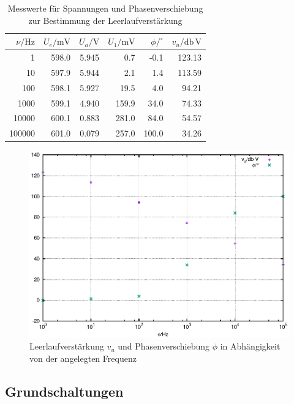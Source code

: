 \documentclass[10pt,a4paper]{scrartcl}
\begin{document}
\begin{table}[!ht]
    \centering
    \caption{Messwerte für Spannungen und Phasenverschiebung zur
    Bestimmung der Leerlaufverstärkung}
    \label{tab:Leerlaufverst}
    \begin{tabular}{r|r|r|r|r|r}
        $\nu/\mathrm{Hz}$&$U_e/\mathrm{mV}$&$U_a/\mathrm V$&$U_1/\mathrm{mV}$&
        $\phi/^\circ$&$v_u/\mathrm{db\,V}$\\
        \hline
                1&  598.0&  5.945&  0.7&   -0.1&123.13\\
               10&  597.9&  5.944&  2.1&    1.4&113.59\\
              100&  598.1&  5.927& 19.5&    4.0&94.21\\
             1000&  599.1&  4.940&159.9&   34.0&74.33\\
            10000&  600.1&  0.883&281.0&   84.0&54.57\\
           100000&  601.0&  0.079&257.0&  100.0&34.26
    \end{tabular}
\end{table}

\begin{figure}[!ht]
    \includegraphics[width=\textwidth]{graphics/plot_leerlaufverst.eps}
    \caption{Leerlaufverstärkung $v_u$ und Phasenverschiebung $\phi$ in 
        Abhängigkeit von der angelegten Frequenz}
    \label{fig:Leerlaufverst}
\end{figure}

\pagebreak
\subsection {Grundschaltungen}
\end{document}

